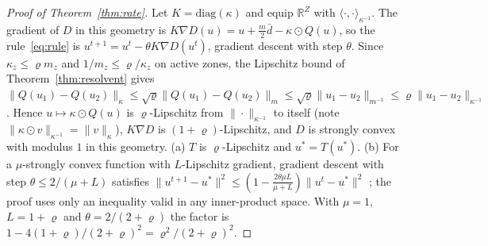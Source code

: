 \documentclass[preprint,12pt]{elsarticle}
\theoremstyle{definition}
\theoremstyle{remark}
\newcommand{\R}{\mathbb{R}}
\newcommand{\ip}[2]{\langle #1,#2\rangle}
\begin{document}
\begin{proof}[Proof of Theorem~\ref{thm:rate}]
Let $K=\mathrm{diag}(\kappa)$ and equip $\R^Z$ with $\ip\cdot\cdot_{\kappa^{-1}}$. The gradient of $D$ in this geometry is $K\nabla D(u)=u+\tfrac m2\bar d-\kappa\odot Q(u)$, so the rule~\eqref{eq:rule} is $u^{t+1}=u^t-\theta K\nabla D(u^t)$, gradient descent with step $\theta$. Since $\kappa_z\le\varrho m_z$ and $1/m_z\le\varrho/\kappa_z$ on active zones, the Lipschitz bound of Theorem~\ref{thm:resolvent} gives $\|Q(u_1)-Q(u_2)\|_\kappa\le\sqrt\varrho\|Q(u_1)-Q(u_2)\|_m\le\sqrt\varrho\|u_1-u_2\|_{m^{-1}}\le\varrho\|u_1-u_2\|_{\kappa^{-1}}$. Hence $u\mapsto\kappa\odot Q(u)$ is $\varrho$-Lipschitz from $\|\cdot\|_{\kappa^{-1}}$ to itself (note $\|\kappa\odot v\|_{\kappa^{-1}}=\|v\|_\kappa$), $K\nabla D$ is $(1+\varrho)$-Lipschitz, and $D$ is strongly convex with modulus $1$ in this geometry. (a) $T$ is $\varrho$-Lipschitz and $u^*=T(u^*)$. (b) For a $\mu$-strongly convex function with $L$-Lipschitz gradient, gradient descent with step $\theta\le2/(\mu+L)$ satisfies $\|u^{t+1}-u^*\|^2\le(1-\tfrac{2\theta\mu L}{\mu+L})\|u^t-u^*\|^2$ \citep[Theorem 2.1.15]{Nesterov2004}; the proof uses only an inequality valid in any inner-product space. With $\mu=1$, $L=1+\varrho$ and $\theta=2/(2+\varrho)$ the factor is $1-4(1+\varrho)/(2+\varrho)^2=\varrho^2/(2+\varrho)^2$.
\end{proof}
\end{document}
